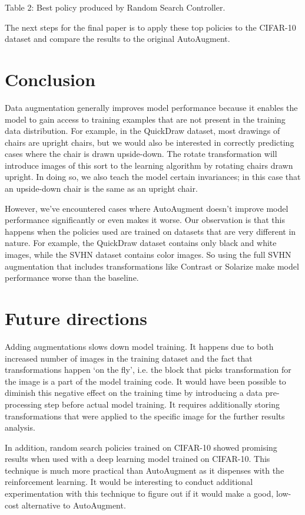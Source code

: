 \documentclass[10pt,twocolumn,letterpaper]{article}
\begin{document}
Table 2: Best policy produced by Random Search Controller.

The next steps for the final paper is to apply these top policies to the CIFAR-10 dataset and compare the results to the original AutoAugment.



\section{Conclusion}

Data augmentation generally improves model performance because it enables the model to gain access to training examples that are not present in the training data distribution. For example, in the QuickDraw dataset, most drawings of chairs are upright chairs, but we would also be interested in correctly predicting cases where the chair is drawn upside-down. The rotate transformation will introduce images of this sort to the learning algorithm by rotating chairs drawn upright. In doing so, we also teach the model certain invariances; in this case that an upside-down chair is the same as an upright chair.

However, we’ve encountered cases where AutoAugment doesn’t improve model performance significantly or even makes it worse. Our observation is that this happens when the policies used are trained on datasets that are very different in nature. For example, the QuickDraw dataset contains only black and white images, while the SVHN dataset contains color images. So using the full SVHN augmentation that includes transformations like Contrast or Solarize make model performance worse than the baseline. 

\section{Future directions}
Adding augmentations slows down model training. It happens due to both increased number of images in the training dataset and the fact that transformations happen ‘on the fly’, i.e. the block that picks transformation for the image is a part of the model training code. It would have been possible to diminish this negative effect on the training time by introducing a data pre-processing step before actual model training. It requires additionally storing transformations that were applied to the specific image for the further results analysis.

In addition, random search policies trained on CIFAR-10 showed promising results when used with a deep learning model trained on CIFAR-10. This technique is much more practical than AutoAugment as it dispenses with the reinforcement learning. It would be interesting to conduct additional experimentation with this technique to figure out if it would make a good, low-cost alternative to AutoAugment. 
\end{document}

